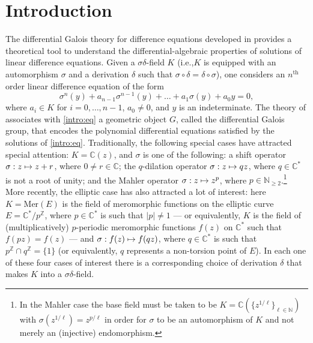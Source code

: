 \documentclass[11pt]{article}
\newcommand{\ie}{i.e.,\xspace}
\numberwithin{equation}{section}\providecommand{\loccit}{\textit{loc.\ cit.}}
\newcommand\mto{\mathchoice{\longmapsto}{\mapsto}{\mapsto}{\mapsto}}
\theoremstyle{definition}
\begin{document}
\section{Introduction}

The differential Galois theory for difference equations developed in \cite{HS} provides a theoretical tool to understand the differential-algebraic properties of solutions of linear difference equations. Given a $\sigma\delta$-field $K$ (\ie $K$ is equipped with an automorphism $\sigma$ and a derivation $\delta$ such that $\sigma\circ\delta=\delta\circ\sigma$), one considers an $n^\text{th}$ order linear difference equation of the form\vspace*{-3pt}
\begin{equation}\label{intro:eq} \sigma^n(y)+a_{n-1}\sigma^{n-1}(y)+\dots+a_1\sigma(y)+a_0y=0,\end{equation}
where $a_i\in K$ for $i=0,\dots,n-1$, $a_0\neq 0$, and $y$ is an indeterminate. The theory of \cite{HS} associates with \eqref{intro:eq} a geometric object $G$, called the differential Galois group, that encodes the polynomial differential equations satisfied by the solutions of \eqref{intro:eq}. Traditionally, the following special cases have attracted special attention: $K=\mathbb{C}(z)$, and $\sigma$ is one of the following: a shift operator $\sigma:z\mto z+r$, where $0\neq r\in\mathbb{C}$; the $q$-dilation operator $\sigma: z\mto qz$, where $q\in\mathbb{C}^*$ is not a root of unity; and the Mahler operator $\sigma : z\mto z^p$, where $p\in\mathbb{N}_{\geq 2}$.\footnote{In the Mahler case the base field must be taken to be $K=\mathbb{C}(\{z^{1/\ell}\}_{\ell\in\mathbb{N}})$ with $\sigma(z^{1/\ell})=z^{p/\ell}$ in order for $\sigma$ to be an automorphism of $K$ and not merely an (injective) endomorphism.} More recently, the elliptic case has also attracted a lot of interest: here $K=\mathrm{Mer}(E)$ is the field of meromorphic functions on the elliptic curve $E=\mathbb{C}^*/p^\mathbb{Z}$, where $p\in\mathbb{C}^*$ is such that $|p|\neq 1$ --- or equivalently, $K$ is the field of (multiplicatively) $p$-periodic meromorphic functions $f(z)$ on $\mathbb{C}^*$ such that $f(pz)=f(z)$ --- and $\sigma:f(z)\mto f(qz)$, where $q\in\mathbb{C}^*$ is such that $p^\mathbb{Z}\cap q^\mathbb{Z}=\{1\}$ (or equivalently, $q$ represents a non-torsion point of $E$). In each one of these four cases of interest there is a corresponding choice of derivation $\delta$ that makes $K$ into a $\sigma\delta$-field.
\end{document}
